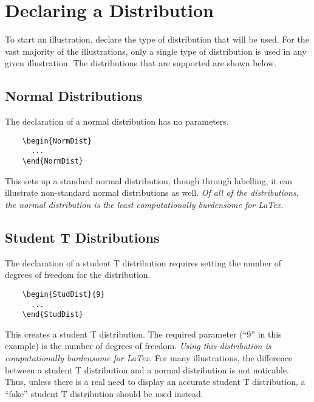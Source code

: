 \documentclass[11pt,letterpaper]{article}
\makeatletter
\renewcommand\tableofcontents{%
  \null\hfill\textbf{\Large\contentsname}\hfill\null\par
  \@mkboth{\MakeUppercase\contentsname}{\MakeUppercase\contentsname}%
  \@starttoc{toc}%
}
\makeatother
\begin{document}
\tableofcontents

\pagebreak

\section{Declaring a Distribution}

To start an illustration, declare the type of distribution that will
be used.  For the vast majority of the illustrations, only a single
type of distribution is used in any given illustration.  The
distributions that are supported are shown below.

\subsection{Normal Distributions} 

The declaration of a normal distribution has no parameters.

  \begin{minipage}{0.3\textwidth}
  \begin{lstlisting}
    \begin{NormDist}
      ...
    \end{NormDist}
  \end{lstlisting}
  \end{minipage}
  \begin{minipage}{0.6\textwidth}
  This sets up a standard normal distribution, though through
  labelling, it can illustrate non-standard normal distributions as
  well.  \textit{Of all of the distributions, the normal distribution
    is the least computationally burdensome for LaTex.}
  \end{minipage}
  
\subsection{Student T Distributions}

The declaration of a student T distribution requires setting the
number of degrees of freedom for the distribution.

  \begin{minipage}{0.3\textwidth}
  \begin{lstlisting}
    \begin{StudDist}{9}
      ...
    \end{StudDist}
  \end{lstlisting}
  \end{minipage}
  \begin{minipage}{0.6\textwidth}
    This creates a student T distribution.  The required parameter
    (``9'' in this example) is the number of degrees of freedom.
    \textit{Using this distribution is computationally burdensome
      for LaTex.}  For many illustrations, the difference between a
    student T distribution and a normal distribution is not noticable.
    Thus, unless there is a real need to display an accurate student T
    distribution, a ``fake'' student T distribution should be used
    instead.
  \end{minipage}
\end{document}
